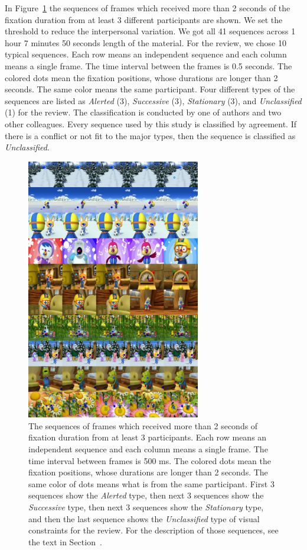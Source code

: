 \documentclass[oneside,master]{snueethesis}
\begin{document}
In Figure~\ref{fig:long-fixations} the sequences of frames which received more than 2 seconds of the fixation duration from at least 3 different participants are shown. We set the threshold to reduce the interpersonal variation. We got all 41 sequences across 1 hour 7 minutes 50 seconds length of the material. For the review, we chose 10 typical sequences. Each row means an independent sequence and each column means a single frame. The time interval between the frames is 0.5 seconds. The colored dots mean the fixation positions, whose durations are longer than 2 seconds. The same color means the same participant. Four different types of the sequences are listed as \textit{Alerted} (3), \textit{Successive} (3), \textit{Stationary} (3), and \textit{Unclassified} (1) for the review. The classification is conducted by one of authors and two other colleagues. Every sequence used by this study is classified by agreement. If there is a conflict or not fit to the major types, then the sequence is classified as \textit{Unclassified}.

\begin{figure}
  \centerline{\includegraphics[width=76mm]{./eps/long_fixations_types.png}}
  \caption[The samples of sequence types]{The sequences of frames which received more than 2 seconds of fixation duration from at least 3 participants. Each row means an independent sequence and each column means a single frame. The time interval between frames is 500 ms. The colored dots mean the fixation positions, whose durations are longer than 2 seconds. The same color of dots means what is from the same participant. First 3 sequences show the \textit{Alerted} type, then next 3 sequences show the \textit{Successive} type, then next 3 sequences show the \textit{Stationary} type, and then the last sequence shows the \textit{Unclassified} type of visual constraints for the review. For the description of those sequences, see the text in Section~\textit{}.}
  \label{fig:long-fixations}
\end{figure}
\end{document}
